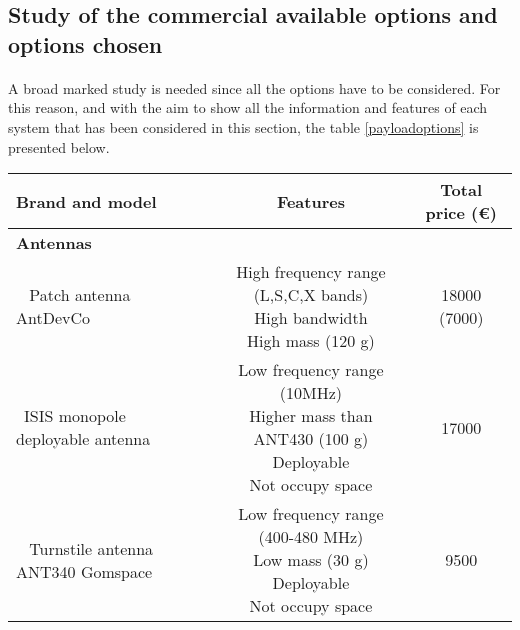\subsection{Study of the commercial available options and options chosen}
\paragraph{}A broad marked study is needed since all the options have to be considered. For this reason, and with the aim to show all the information and features of each system that has been considered in this section, the table \ref{payloadoptions} is presented below.

\begin{longtable}{| l | c | c | }
\hline
\rowcolor[gray]{0.80}	\textbf{Brand and model} &  \textbf{Features}     & \textbf{Total price (\euro)}   \\
\hline
\endfirsthead

\rowcolor[gray]{0.85} \textbf{Antennas} &  &  \\
	   ~	Patch antenna AntDevCo & \makecell{High frequency range (L,S,C,X bands)\\ High bandwidth \\High mass (120 g)} & 18000 (7000) \\
	   \hline
	  ~ISIS monopole deployable antenna & \makecell{Low frequency range (10MHz) \\ Higher mass than ANT430 (100 g) \\ Deployable \\ Not occupy space} & 17000 \\
	   \hline
	  ~	Turnstile antenna ANT340 Gomspace & \makecell{Low frequency range (400-480 MHz) \\ Low mass (30 g) \\ Deployable \\ Not occupy space} & 9500 \\
	   \hline
	\hline


\end{longtable}
